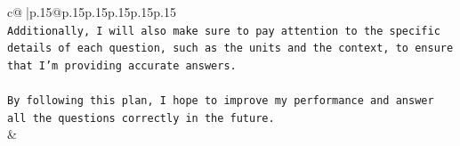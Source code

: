 \documentclass{article}
\begin{document}
{\begin{supertabular}{c@{$\;$}|p{.15\linewidth}@{}p{.15\linewidth}p{.15\linewidth}p{.15\linewidth}p{.15\linewidth}p{.15\linewidth}}
{{{\\ 
\texttt{Additionally, I will also make sure to pay attention to the specific details of each question, such as the units and the context, to ensure that I'm providing accurate answers.} \\
\\ 
\texttt{By following this plan, I hope to improve my performance and answer all the questions correctly in the future.} \\
            }
        }
    }
    & \\ \\

\end{supertabular}
}
\end{document}
